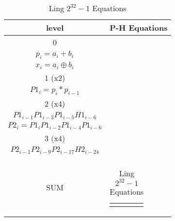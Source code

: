 \begin{table}[H]
\centering
     \begin{tabularx}{\textwidth}{ || c | X || } 

        \hline
        level & P-H Equations\\
        \hline
        \hline
        
        0   & 
        \begin{tabular}{@{}c@{}}
        $g_i = a_i * b_i$\\
        $p_i = a_i + b_i$\\
        $x_i = a_i \oplus b_i $
        \end{tabular}\\\hline

        
        1 (x2)  & 
        \begin{tabular}{@{}c@{}}
        $H1_i = g_i + g_{i-1}$\\
        $P1_i = p_i * p_{i-1}$
        \end{tabular}\\\hline

        2 (x4)  & 
        \begin{tabular}{@{}c@{}}
        $H2_i = H1_i + P1_{i-1}H1_{i-2} + P1_{i-1}P1_{i-3}H1_{i-4} +$ \\ $P1_{i-1}P1_{i-3}P1_{i-5}H1_{i-6}$\\
        $P2_i = P1_{i}P1_{i-2}P1_{i-4}P1_{i-6} $
        \end{tabular}\\\hline

        
        3 (x4)  & 
        \begin{tabular}{@{}c@{}}
        $H3_i = H2_i + P2_{i-1}H2_{i-8} + P2_{i-1}P2_{i-9}H2_{i-16} +$ \\ $P2_{i-1}P2_{i-9}P2_{i-17}H2_{i-24}$\\
        \end{tabular}\\\hline
        
        SUM   & 
        \begin{tabular}{@{}c@{}}
        $ sum_i = H3_{i-1}\ ?\ (x_i \oplus p_{i-1})\ :\ x_i$
        \end{tabular}\\\hline

    \end{tabularx}
    
    

\caption{Ling $2^{32}-1$ Equations}
\end{table}




